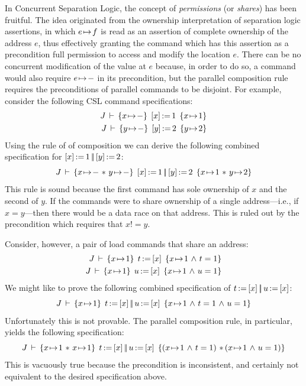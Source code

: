 \documentclass[11pt]{report}
\begin{document}
In Concurrent Separation Logic, the concept of \emph{permissions} (or \emph{shares}) has been fruitful. The idea originated from the ownership interpretation of separation logic assertions, in which $e \!\mapsto\! f$ is read as an assertion of complete ownership of the address $e$, thus effectively granting the command which has this assertion as a precondition full permission to access and modify the location $e$. There can be no concurrent modification of the value at $e$ because, in order to do so, a command would also require $e \!\mapsto\! -$ in its precondition, but the parallel composition rule requires the preconditions of parallel commands to be disjoint. For example, consider the following CSL command specifications: \begin{align*}
  \spec{J}{x \fpointsto -}{\cstore{x}{1}}{x \fpointsto 1} \\ 
  \spec{J}{y \fpointsto -}{\cstore{y}{2}}{y \fpointsto 2}
\end{align*}Using the rule of of composition we can derive the following combined specification for $\left[ x \right] \operatorname{:\!=} 1 \operatorname{|\!|} \left[ y \right] \operatorname{:\!=} 2$: \[ \spec{J}{x \fpointsto - \fsep y \fpointsto -}{\cstore{x}{1} \oppar \cstore{y}{2}}{x \fpointsto 1 \fsep y \fpointsto 2} \] This rule is sound because the first command has sole ownership of $x$ and the second of $y$. If the commands were to share ownership of a single address---i.e., if $x = y$---then there would be a data race on that address. This is ruled out by the precondition which requires that $x != y$. 

Consider, however, a pair of load commands that share an address: \begin{align*}
  \spec{J}{x \fpointsto 1}{\cload{t}{x}}{x \fpointsto 1 \conj t = 1} \\
  \spec{J}{x \fpointsto 1}{\cload{u}{x}}{x \fpointsto 1 \conj u = 1}
\end{align*}
We might like to prove the following combined specification of $t \operatorname{:\!=} \left[ x \right] \operatorname{|\!|} u \operatorname{:\!=} \left[ x \right]$: \[ J\,\vdash\,\left\lbrace x \!\mapsto\! 1 \right\rbrace\;t \operatorname{:\!=} \left[ x \right] \operatorname{|\!|} u \operatorname{:\!=} \left[ x \right]\;\left\lbrace x \!\mapsto\! 1 \operatorname{\,\wedge\,} t = 1 \operatorname{\,\wedge\,} u = 1 \right\rbrace \] Unfortunately this is not provable. The parallel composition rule, in particular, yields the following specification: \[ \spec{J}{x \fpointsto 1 \fsep x \fpointsto 1}{\cload{t}{x} \oppar \cload{u}{x}}{(x \fpointsto 1 \conj t = 1) \fsep (x \fpointsto 1 \conj u = 1)}\] This is vacuously true because the precondition is inconsistent, and certainly not equivalent to the desired specification above.
\end{document}
